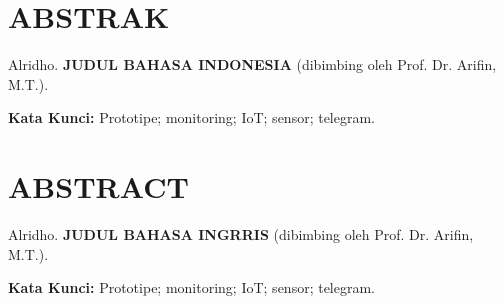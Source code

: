 \begingroup
\singlespacing
\chapter*{ABSTRAK}

\noindent
Alridho. \textbf{JUDUL BAHASA INDONESIA} (dibimbing oleh Prof. Dr. Arifin, M.T.). \par

\vspace*{0.1cm}

\noindent
\lipsum[1] \par

\vspace*{0.1cm}

\noindent
\textbf{Kata Kunci:} Prototipe; monitoring; IoT; sensor; telegram.

\endgroup

\newpage

\begingroup
\singlespacing
\chapter*{ABSTRACT}

\noindent
Alridho. \textbf{JUDUL BAHASA INGRRIS} (dibimbing oleh Prof. Dr. Arifin, M.T.). \par

\vspace*{0.1cm}
 
\noindent
\lipsum[1]


\vspace*{0.1cm}

\noindent
\textbf{Kata Kunci:} Prototipe; monitoring; IoT; sensor; telegram.

\endgroup
